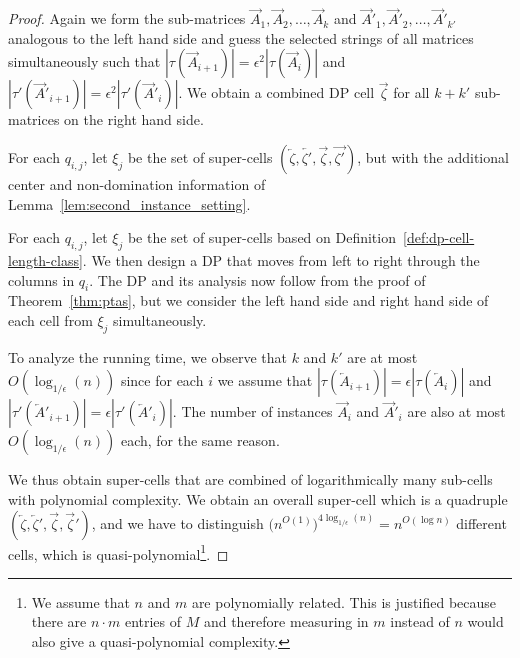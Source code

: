 \begin{proof}
    Again we form the sub-matrices $\overrightarrow{A}_1,\overrightarrow{A}_2,\dotsc,\overrightarrow{A}_{k}$ and  $\overrightarrow{A}'_1,\overrightarrow{A}'_2,\dotsc,\overrightarrow{A}'_{k'}$ analogous to the left hand side and guess the selected strings of all matrices simultaneously 
    such that $|\tau(\overrightarrow{A}_{i+1})| =  \epsilon^2 |\tau(\overrightarrow{A}_{i})|$ and  $|\tau'(\overrightarrow{A}'_{i+1})| =  \epsilon^2 |\tau'(\overrightarrow{A}'_{i})|$. 
    We obtain a combined DP cell $\overrightarrow{\zeta}$ for all $k+k'$ sub-matrices on the right hand side.
    \begin{definition} %
        For each $q_{i,j}$, let $\xi_j$ be the set of super-cells $(\overleftarrow{\zeta}, \overleftarrow{\zeta'}, \overrightarrow{\zeta}, \overrightarrow{\zeta'})$, but with the additional center and non-domination information of Lemma~\ref{lem:second_instance_setting}.
        \label{def:dp-cell-length-class}
    \end{definition}

    For each $q_{i,j}$, let $\xi_j$ be the set of super-cells based on Definition~\ref{def:dp-cell-length-class}.
    We then design a DP that moves from left to right through the columns in $q_i$.
    The DP and its analysis now follow from the proof of Theorem~\ref{thm:ptas}, but we consider the left hand side and right hand side of each cell from $\xi_j$ simultaneously.

    To analyze the running time, we observe that $k$ and $k'$ are at most $O(\log_{1/\epsilon}(n))$ since for each $i$ we assume that $|\tau(\overleftarrow{A}_{i+1})| =  \epsilon |\tau(\overleftarrow{A}_{i})|$
    and $|\tau'(\overleftarrow{A}'_{i+1})| =  \epsilon |\tau'(\overleftarrow{A}'_{i})|$. 
    The number of instances $\overrightarrow{A}_i$ and $\overrightarrow{A}'_i$ are also at most $O(\log_{1/\epsilon}(n))$ each, for the same reason.

    We thus obtain super-cells that are combined of logarithmically many sub-cells with polynomial complexity.
    We obtain an overall super-cell which is a quadruple $(\overleftarrow{\zeta},\overleftarrow{\zeta}',\overrightarrow{\zeta},\overrightarrow{\zeta}')$, and we have to distinguish $\bigl(n^{O(1)}\bigr)^{4 \log_{1/\epsilon}(n)} = n^{O(\log n)}$
    different cells, which is quasi-polynomial\footnote{We assume that $n$ and $m$ are polynomially related. This is justified because there are $n \cdot m$ entries of $M$ and therefore measuring in $m$ instead of $n$ would also give a quasi-polynomial complexity.}.


\end{proof}
